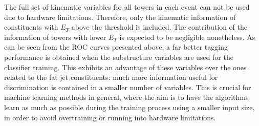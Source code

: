 \documentclass[main]{subfiles} %
\begin{document}
The full set of kinematic variables for all towers in each event can not be used due to hardware limitations. Therefore, only the kinematic information of constituents with $E_T$ above the threshold is included. The contribution of the information of towers with lower $E_T$ is expected to be negligible nonetheless. As can be seen from the ROC curves presented above, a far better tagging performance is obtained when the substructure variables are used for the classifier training. This exhibits an advantage of these variables over the ones related to the fat jet constituents: much more information useful for discrimination is contained in a smaller number of variables. This is crucial for machine learning methods in general, where the aim is to have the algorithms learn as much as possible during the training process using a smaller input size, in order to avoid overtraining or running into hardware limitations. 

















\biblio
\end{document}
